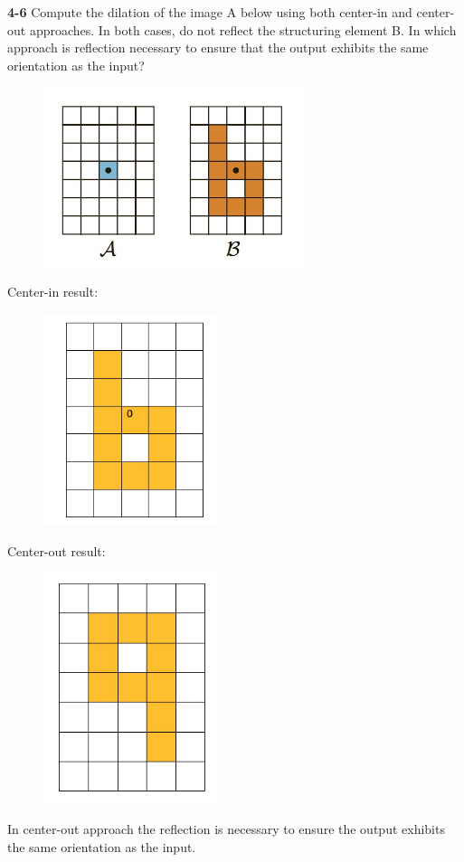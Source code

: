 \documentclass[a4paper]{article}
\begin{document}
\begin{spacing}{2.0}
	\noindent
	\textbf{4-6} Compute the dilation of the image A below using both center-in and center-out approaches. In both cases, do not reflect the structuring element B. In which approach is reflection necessary to ensure that the output exhibits the same orientation as the input?
	\begin{figure}[H]
	\centering
	\includegraphics[width = 3in]{2.jpg}
	\end{figure}
	
	Center-in result: 
	\begin{figure}[H]
	\centering
	\includegraphics[width = 2in]{centerin.jpg}
	\end{figure}
	
	
	Center-out result: 
	\begin{figure}[H]
	\centering
	\includegraphics[width = 2in]{centerout.jpg}
	\end{figure}
In center-out approach the reflection is necessary to ensure the output exhibits the same orientation as the input.
		

\end{spacing}
\end{document}
